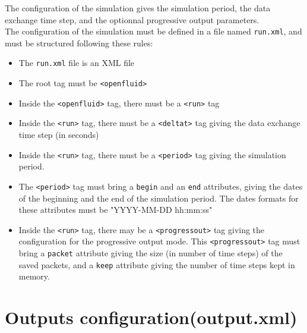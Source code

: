 The configuration of the simulation gives the simulation period, the data exchange time step, and the optionnal progressive output parameters.\\
\noindent The configuration of the simulation must be defined in a file named \texttt{run.xml},
and must be structured following these rules:
\begin{itemize}
  \item The \texttt{run.xml} file is an XML file
  \item The root tag must be \texttt{<openfluid>}
  \item Inside the \texttt{<openfluid>} tag, there must be a \texttt{<run>} tag
  \item Inside the \texttt{<run>} tag, there must be a \texttt{<deltat>} tag giving the data exchange time step (in seconds) 
  \item Inside the \texttt{<run>} tag, there must be a \texttt{<period>} tag giving the simulation period.
  \item The \texttt{<period>} tag must bring a \texttt{begin} and an \texttt{end} attributes, giving the dates of the beginning and the end of the simulation period.
  The dates formats for these attributes must be "YYYY-MM-DD hh:mm:ss"  
  \item Inside the \texttt{<run>} tag, there may be a \texttt{<progressout>} tag giving the configuration for the progressive output mode.
  This \texttt{<progressout>} tag must bring a \texttt{packet} attribute giving the size (in number of time steps) of the saved packets, and a \texttt{keep} attribute giving the number of time steps kept in memory.   
\end{itemize}


\bigskip

\section{Outputs configuration(output.xml)}

